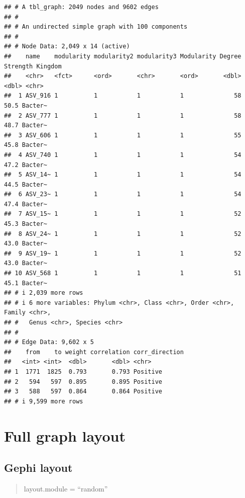 \documentclass[
]{book}
\begin{document}
\begin{verbatim}
## # A tbl_graph: 2049 nodes and 9602 edges
## #
## # An undirected simple graph with 100 components
## #
## # Node Data: 2,049 x 14 (active)
##    name    modularity modularity2 modularity3 Modularity Degree Strength Kingdom
##    <chr>   <fct>      <ord>       <chr>       <ord>       <dbl>    <dbl> <chr>  
##  1 ASV_916 1          1           1           1              58     50.5 Bacter~
##  2 ASV_777 1          1           1           1              58     48.7 Bacter~
##  3 ASV_606 1          1           1           1              55     45.8 Bacter~
##  4 ASV_740 1          1           1           1              54     47.2 Bacter~
##  5 ASV_14~ 1          1           1           1              54     44.5 Bacter~
##  6 ASV_23~ 1          1           1           1              54     47.4 Bacter~
##  7 ASV_15~ 1          1           1           1              52     45.3 Bacter~
##  8 ASV_24~ 1          1           1           1              52     43.0 Bacter~
##  9 ASV_19~ 1          1           1           1              52     43.0 Bacter~
## 10 ASV_568 1          1           1           1              51     45.1 Bacter~
## # i 2,039 more rows
## # i 6 more variables: Phylum <chr>, Class <chr>, Order <chr>, Family <chr>,
## #   Genus <chr>, Species <chr>
## #
## # Edge Data: 9,602 x 5
##    from    to weight correlation corr_direction
##   <int> <int>  <dbl>       <dbl> <chr>         
## 1  1771  1825  0.793       0.793 Positive      
## 2   594   597  0.895       0.895 Positive      
## 3   588   597  0.864       0.864 Positive      
## # i 9,599 more rows
\end{verbatim}

\section{Full graph layout}\label{full-graph-layout}

\subsection{Gephi layout}\label{gephi-layout}

\begin{quote}
layout.module = ``random''
\end{quote}
\end{document}

